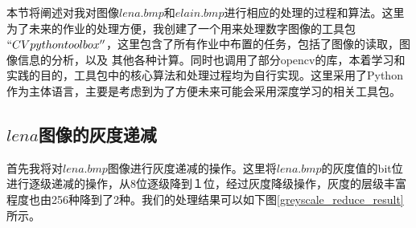\documentclass[UTF8]{ctexart}
\begin{document}
本节将阐述对我对图像$lena.bmp$和$elain.bmp$进行相应的处理的过程和算法。这里为了未来的作业的处理方便，我创建了一个用来处理数字图像的工具包$``CV python toolbox''$，这里包含了所有作业中布置的任务，包括了图像的读取，图像信息的分析，以及
其他各种计算。同时也调用了部分opencv的库，本着学习和实践的目的，工具包中的核心算法和处理过程均为自行实现。这里采用了Python作为主体语言，主要是考虑到为了方便未来可能会采用深度学习的相关工具包。

\subsection{$lena$图像的灰度递减}

首先我将对$lena.bmp$图像进行灰度递减的操作。这里将$lena.bmp$的灰度值的bit位进行逐级递减的操作，从8位逐级降到１位，经过灰度降级操作，灰度的层级丰富程度也由256种降到了2种。我们的处理结果可以如下图\ref{greyscale_reduce_result}所示。
\end{document}
